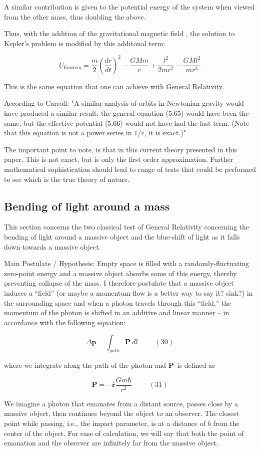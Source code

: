 \documentclass {article}
\renewcommand\vec{\mathbf}
\let\OldHat\hat
\renewcommand{\hat}[1]{\OldHat{\mathbf{#1}}}
\begin{document}
A similar contribution is given to the potential energy of the system when viewed from the other mass, thus doubling the above. 

Thus, with the addition of the gravitational magnetic field , the solution to Kepler's problem is modified by this additonal term:

$$ U_{\text{Einstein}} = \frac m 2 (\frac {dr} {dt})^2 - \frac {GMm} r + \frac {l^2} {2mr^2} - \frac {GMl^2}{mr^3}$$

This is the same equation that one can achieve with General Relativity. 

According to Carroll: "A similar analysis of orbits in Newtonian gravity would have produced a similar result; the general equation (5.65) would have been the same, but the effective potential (5.66) would not have had the last term. (Note that this equation is not a power series in $1/r$, it is exact.)"

The important point to note, is that in this current theory presented in this paper. This is not exact, but is only the first order approximation. Further mathematical sophistication should lead to range of tests that could be performed to see which is the true theory of nature.


\newpage
\subsection{Bending of light around a mass}
This section concerns the two classical test of General Relativity concerning the bending of light around a massive object and the blue-shift of light as it falls down towards a massive object.

Main Postulate / Hypothesis: Empty space is filled with a randomly-fluctuating zero-point energy and a massive object absorbs some of this energy, thereby preventing collapse of the mass. I therefore postulate that a massive object induces a “field” (or maybe a momentum-flow is a better way to say it? sink?) in the surrounding space and when a photon travels through this “field,” the momentum of the photon is shifted in an additive and linear manner – in accordance with the following equation: 

$$\Delta \vec p = \int_{path} \vec P ~ dl ~~~~~~~~~~~ (30)$$

where we integrate along the path of the photon and $\vec P$ is defined as

$$\vec P = - \hat r \frac {Gm\hbar}{r^2} ~~~~~~~~~~~ (31)$$

We imagine a photon that emanates from a distant source, passes close by a massive object, then continues beyond the object to an observer. The closest point while passing, i.e., the impact parameter, is at a distance of $b$ from the center of the object. For ease of calculation, we will say that both the point of emanation and the observer are infinitely far from the massive object.
\end{document}
